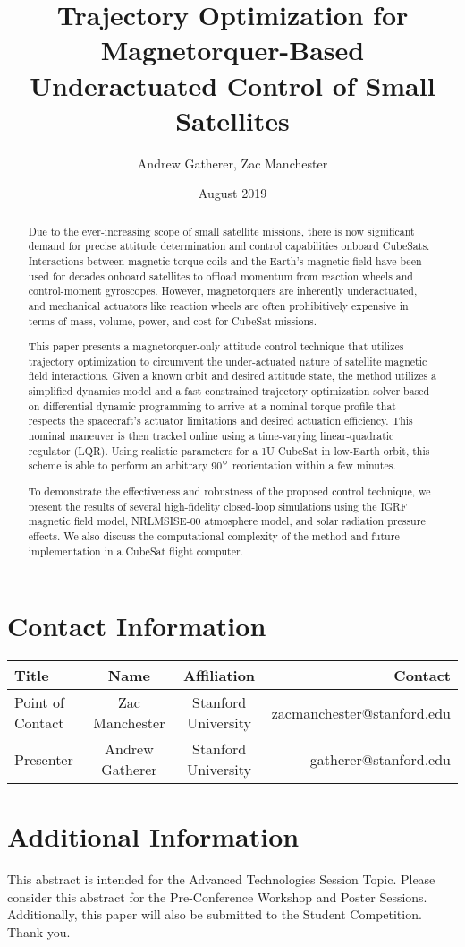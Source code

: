 \documentclass{article}
\begin{document}
\title{Trajectory Optimization for Magnetorquer-Based Underactuated Control of Small Satellites}
\author{Andrew Gatherer, Zac Manchester}
\date{August 2019}
\maketitle

\begin{abstract}
Due to the ever-increasing scope of small satellite missions, there is now significant demand for precise attitude determination and control capabilities onboard CubeSats. Interactions between magnetic torque coils and the Earth's magnetic field have been used for decades onboard satellites to offload momentum from reaction wheels and control-moment gyroscopes. However, magnetorquers are inherently underactuated, and mechanical actuators like reaction wheels are often prohibitively expensive in terms of mass, volume, power, and cost for CubeSat missions.

This paper presents a magnetorquer-only attitude control technique that utilizes trajectory optimization to circumvent the under-actuated nature of satellite magnetic field interactions. Given a known orbit and desired attitude state, the method utilizes a simplified dynamics model and a fast constrained trajectory optimization solver based on differential dynamic programming to arrive at a nominal torque profile that respects the spacecraft's actuator limitations and desired actuation efficiency. This nominal maneuver is then tracked online using a time-varying linear-quadratic regulator (LQR). Using realistic parameters for a 1U CubeSat in low-Earth orbit, this scheme is able to perform an arbitrary 90$\degree$ reorientation within a few minutes.

To demonstrate the effectiveness and robustness of the proposed control technique, we present the results of several high-fidelity closed-loop simulations using the IGRF magnetic field model, NRLMSISE-00 atmosphere model, and solar radiation pressure effects. We also discuss the computational complexity of the method and future implementation in a CubeSat flight computer.

\end{abstract}

\section{Contact Information}
\begin{tabular}{l | c | c | r}
	\hline
	Title & Name & Affiliation & Contact\\
	\hline
	Point of Contact & Zac Manchester & Stanford University & zacmanchester@stanford.edu\\
	Presenter & Andrew Gatherer & Stanford University & gatherer@stanford.edu\\
\end{tabular}
	
\section{Additional Information}
This abstract is intended for the Advanced Technologies Session Topic. Please consider this abstract for the Pre-Conference Workshop and Poster Sessions. Additionally, this paper will also be submitted to the Student Competition. Thank you. 
\end{document}
